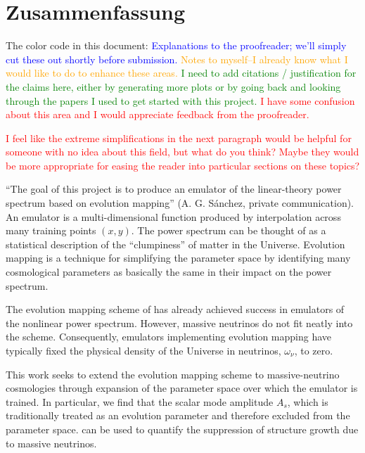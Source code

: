 

\chapter*{Zusammenfassung}

The color code in this document: \textcolor{blue}{Explanations to the
proofreader; we'll simply cut these out shortly before submission.}
\textcolor{orange}{Notes to myself--I already know what I would like to do to
enhance these areas.} \textcolor{green}{I need to add citations / 
justification for the claims here, either by generating more plots or by going
back and looking through the papers I used to get started with this project.}
\textcolor{red}{I have some confusion about this area and I would appreciate
feedback from the proofreader.}

\textcolor{red}{I feel like the extreme simplifications in the next paragraph
would be helpful for someone with no idea about this field, but what do you
think? Maybe they would be more appropriate for easing the reader into
particular sections on these topics?}

``The goal of this project is to produce an emulator of the linear-theory
power spectrum based on evolution mapping'' (A. G. S\'{a}nchez, private
communication). An emulator is a multi-dimensional function
produced by interpolation across many training points $(x, y)$. The power
spectrum can be thought of as a statistical description of the ``clumpiness''
of matter in the Universe. Evolution mapping is a technique for simplifying
the parameter space by identifying many cosmological parameters as basically
the same in their impact on the power spectrum.

The evolution mapping scheme of  has already achieved success in
emulators of the nonlinear power spectrum. However, massive neutrinos do not
fit neatly into the scheme. Consequently, emulators implementing evolution
mapping have typically fixed the physical density of the Universe in 
neutrinos, $\omega_\nu$, to zero.

This work seeks to extend the evolution mapping scheme to massive-neutrino 
cosmologies through expansion of the parameter space over which the emulator
is trained. In particular, we find that the scalar mode amplitude $A_s$, which
is traditionally treated as an evolution parameter and therefore excluded from 
the parameter space. can be used to quantify the suppression of structure 
growth due to massive neutrinos.

